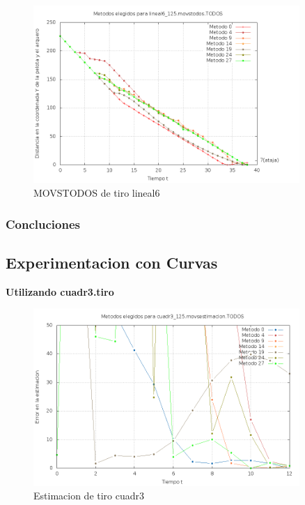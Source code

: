 \begin{figure}[H]
\begin{center}
\includegraphics[width=0.9\textwidth]{img/lineal6_125_movstodos_TODOS_elegidos.png}
     \caption{MOVSTODOS de tiro lineal6}
\end{center}
\end{figure}

\subsubsection{Concluciones}
\subsection{Experimentacion con Curvas}

\textbf{Utilizando cuadr3.tiro}

\begin{figure}[H]
\begin{center}
\includegraphics[width=0.9\textwidth]{img/cuadr3_125_movsestimacion_TODOS_elegidos.png}
     \caption{Estimacion de tiro cuadr3}
\end{center}
\end{figure}

